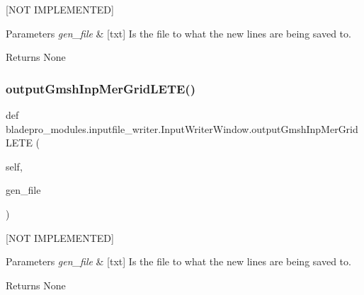\mbox{[}N\+OT I\+M\+P\+L\+E\+M\+E\+N\+T\+ED\mbox{]} 


\begin{DoxyParams}{Parameters}
{\em gen\+\_\+file} & \mbox{[}txt\mbox{]} Is the file to what the new lines are being saved to. \\
\hline
\end{DoxyParams}
\begin{DoxyReturn}{Returns}
None 
\end{DoxyReturn}
\hypertarget{classbladepro__modules_1_1inputfile__writer_1_1_input_writer_window_aa07573686af3bd04e4ff42c3dddcf975}{}\label{classbladepro__modules_1_1inputfile__writer_1_1_input_writer_window_aa07573686af3bd04e4ff42c3dddcf975} 
\subsubsection{\texorpdfstring{output\+Gmsh\+Inp\+Mer\+Grid\+L\+E\+T\+E()}{outputGmshInpMerGridLETE()}}
{\footnotesize\ttfamily def bladepro\+\_\+modules.\+inputfile\+\_\+writer.\+Input\+Writer\+Window.\+output\+Gmsh\+Inp\+Mer\+Grid\+L\+E\+TE (\begin{DoxyParamCaption}\item[{}]{self,  }\item[{}]{gen\+\_\+file }\end{DoxyParamCaption})}



\mbox{[}N\+OT I\+M\+P\+L\+E\+M\+E\+N\+T\+ED\mbox{]} 


\begin{DoxyParams}{Parameters}
{\em gen\+\_\+file} & \mbox{[}txt\mbox{]} Is the file to what the new lines are being saved to. \\
\hline
\end{DoxyParams}
\begin{DoxyReturn}{Returns}
None 
\end{DoxyReturn}
\hypertarget{classbladepro__modules_1_1inputfile__writer_1_1_input_writer_window_a0044216044b48baae08e478a2f358c39}{}\label{classbladepro__modules_1_1inputfile__writer_1_1_input_writer_window_a0044216044b48baae08e478a2f358c39} 
